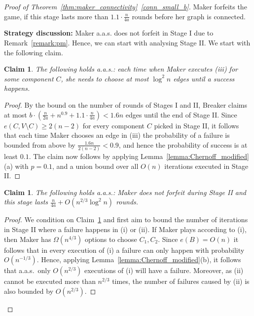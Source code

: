 \documentclass[11pt, a4paper]{article}
\numberwithin{equation}{section}
\numberwithin{figure}{section}
\newtheorem{claim}[theorem]{Claim}
\begin{document}
\begin{proof}[Proof of Theorem~\ref{thm:maker_connectivity}~\ref{conn_small_b}]
Maker forfeits the game, if this stage lasts more than $1.1\cdot \frac{n}{4a}$ rounds before her graph is connected.




\bigskip

\noindent
\textbf{Strategy discussion:}
Maker a.a.s. does not forfeit in Stage I
due to Remark~\ref{remark:pm}. Hence, we
can start with analysing Stage II.
We start with the following claim.

\begin{claim}\label{clm:Connectivity:failuresII}
The following holds a.a.s.:
each time when Maker executes (iii) for some component $C$,
she needs to choose at most $\log^2 n$ edges until
a success happens.
\end{claim}

\begin{proof}
By the bound on the number of rounds of Stages I and II,
Breaker claims at most 
$b\cdot \left(\frac{n}{2a} + n^{0.9} + 1.1\cdot \frac{n}{4a} \right) < 1.6 n$ 
edges until the end of Stage II. Since $e(C,V\setminus C)\geq 2(n-2)$ for every component $C$ picked in Stage II, it follows that each time Maker chooses an edge in (iii)
the probability of a failure is bounded from above by
$\frac{1.6n}{2(n-2)} < 0.9$, and hence the probability of success
is at least $0.1$. The claim now follows by applying Lemma~\ref{lemma:Chernoff_modified}(a) with $p=0.1$,
and a union bound over all $O(n)$ iterations executed in Stage II.
\end{proof}

\begin{claim}
The following holds a.a.s.: Maker does not forfeit during Stage II and this stage lasts 
$\frac{n}{4a} + O(n^{2/3}\log^2 n)$
rounds.
\end{claim}

\begin{proof}
We condition on Claim~\ref{clm:Connectivity:failuresII}
and first aim to bound the number of iterations
in Stage II where a failure happens in (i) or (ii).
If Maker plays according to (i),
then Maker has $\Omega(n^{4/3})$ options to choose $C_1,C_2$.
Since $e(B)=O(n)$ it follows that in every execution of (i) a failure can only happen with probability $O(n^{-1/3})$.
Hence, applying Lemma~\ref{lemma:Chernoff_modified}(b), it follows that
a.a.s.~only $O(n^{2/3})$ executions of (i) will have a failure.
Moreover, as (ii) cannot be executed more than $n^{2/3}$
times, the number of failures caused by (ii) is also bounded by $O(n^{2/3})$. 


\end{proof}
\end{proof}
\end{document}
